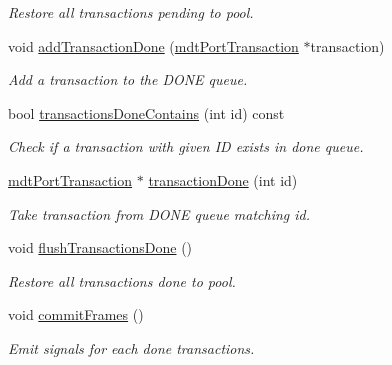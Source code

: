 \begin{DoxyCompactItemize}
\begin{DoxyCompactList}\small\item\em Restore all transactions pending to pool. \end{DoxyCompactList}\item 
void \hyperlink{classmdt_port_manager_a4b584d9005316be9991e6026e4c5e5a4}{addTransactionDone} (\hyperlink{classmdt_port_transaction}{mdtPortTransaction} $\ast$transaction)
\begin{DoxyCompactList}\small\item\em Add a transaction to the DONE queue. \end{DoxyCompactList}\item 
\hypertarget{classmdt_port_manager_a3293066f4c3ed2e4b116f28dca8c5d64}{
bool \hyperlink{classmdt_port_manager_a3293066f4c3ed2e4b116f28dca8c5d64}{transactionsDoneContains} (int id) const }
\label{classmdt_port_manager_a3293066f4c3ed2e4b116f28dca8c5d64}

\begin{DoxyCompactList}\small\item\em Check if a transaction with given ID exists in done queue. \end{DoxyCompactList}\item 
\hyperlink{classmdt_port_transaction}{mdtPortTransaction} $\ast$ \hyperlink{classmdt_port_manager_a5869bcf6774a86fb9d3b00a0d4211bb5}{transactionDone} (int id)
\begin{DoxyCompactList}\small\item\em Take transaction from DONE queue matching id. \end{DoxyCompactList}\item 
\hypertarget{classmdt_port_manager_aad801de5f93a3619d98b7ea3cae6b999}{
void \hyperlink{classmdt_port_manager_aad801de5f93a3619d98b7ea3cae6b999}{flushTransactionsDone} ()}
\label{classmdt_port_manager_aad801de5f93a3619d98b7ea3cae6b999}

\begin{DoxyCompactList}\small\item\em Restore all transactions done to pool. \end{DoxyCompactList}\item 
void \hyperlink{classmdt_port_manager_a84d37b380080eb26e56c68424dedd958}{commitFrames} ()
\begin{DoxyCompactList}\small\item\em Emit signals for each done transactions. \end{DoxyCompactList}\end{DoxyCompactItemize}
